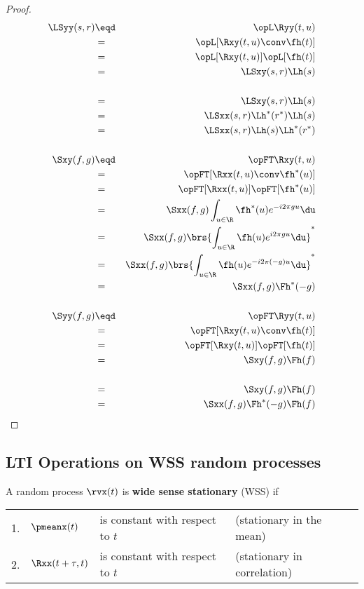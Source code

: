 \begin{proof}
\begin{eqnarray*}
   \LSyy(s,r)
     &\eqd& \opL\Ryy(t,u)
   \\&=&    \opL[\Rxy(t,u) \conv \fh(t)]
   \\&=&    \opL[\Rxy(t,u)]\opL[\fh(t)]
   \\&=&    \LSxy(s,r) \Lh(s)
\\
   \\&=&    \LSxy(s,r) \Lh(s)
   \\&=&    \LSxx(s,r) \Lh^\ast(r^\ast)\Lh(s)
   \\&=&    \LSxx(s,r) \Lh(s) \Lh^\ast(r^\ast)
\\ \\
   \Sxy(f,g)
     &\eqd& \opFT\Rxy(t,u)
   \\&=&    \opFT[\Rxx(t,u) \conv \fh^\ast(u)]
   \\&=&    \opFT[\Rxx(t,u)]\opFT[\fh^\ast(u)]
   \\&=&    \Sxx(f,g) \int_{u\in\R}\fh^\ast(u) e^{-i2\pi g u} \du
   \\&=&    \Sxx(f,g) \brs{\int_{u\in\R}\fh(u) e^{i2\pi g u} \du }^\ast
   \\&=&    \Sxx(f,g) \brs{\int_{u\in\R}\fh(u) e^{-i2\pi(-g)u} \du }^\ast
   \\&=&    \Sxx(f,g) \Fh^\ast(-g)
\\ \\
   \Syy(f,g)
     &\eqd& \opFT\Ryy(t,u)
   \\&=&    \opFT[\Rxy(t,u) \conv \fh(t)]
   \\&=&    \opFT[\Rxy(t,u)]\opFT[\fh(t)]
   \\&=&    \Sxy(f,g) \Fh(f)
\\
   \\&=&    \Sxy(f,g) \Fh(f)
   \\&=&    \Sxx(f,g) \Fh^\ast(-g) \Fh(f)
\end{eqnarray*}
\end{proof}


\subsection{LTI Operations on WSS random processes}
\begin{definition}
\label{def:wss}
A random process $\rvx(t)$ is \textbf{wide sense stationary} (WSS) if

\begin{tabular}{llll}
   1. & $\pmeanx(t)$         & is constant with respect to $t$ & (stationary in the mean) \\
   2. & $\Rxx(t+\tau,t)$ & is constant with respect to $t$ & (stationary in correlation)
\end{tabular}
\end{definition}

